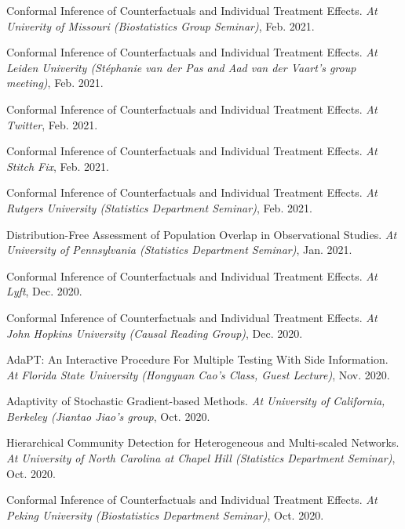 \documentclass{article}
\begin{document}
\vspace{2mm}
Conformal Inference of Counterfactuals and Individual Treatment Effects. \emph{At Univerity of Missouri (Biostatistics Group Seminar)}, Feb. 2021.

\vspace{2mm}
Conformal Inference of Counterfactuals and Individual Treatment Effects. \emph{At Leiden Univerity (Stéphanie van der Pas and Aad van der Vaart's group meeting)}, Feb. 2021.

\vspace{2mm}
Conformal Inference of Counterfactuals and Individual Treatment Effects. \emph{At Twitter}, Feb. 2021.

\vspace{2mm}
Conformal Inference of Counterfactuals and Individual Treatment Effects. \emph{At Stitch Fix}, Feb. 2021.

\vspace{2mm}
Conformal Inference of Counterfactuals and Individual Treatment Effects. \emph{At Rutgers University (Statistics Department Seminar)}, Feb. 2021.

\vspace{2mm}
Distribution-Free Assessment of Population Overlap in Observational Studies. \emph{At University of Pennsylvania (Statistics Department Seminar)}, Jan. 2021.

\vspace{2mm}
Conformal Inference of Counterfactuals and Individual Treatment Effects. \emph{At Lyft}, Dec. 2020.

\vspace{2mm}
Conformal Inference of Counterfactuals and Individual Treatment Effects. \emph{At John Hopkins University (Causal Reading Group)}, Dec. 2020.

\vspace{2mm}
AdaPT: An Interactive Procedure For Multiple Testing With Side Information. \emph{At Florida State University (Hongyuan Cao's Class, Guest Lecture)}, Nov. 2020. 

\vspace{2mm}
Adaptivity of Stochastic Gradient-based Methods. \emph{At University of California, Berkeley (Jiantao Jiao's group}, Oct. 2020. 

\vspace{2mm}
Hierarchical Community Detection for Heterogeneous and Multi-scaled Networks. \emph{At University of North Carolina at Chapel Hill (Statistics Department Seminar)}, Oct. 2020. 

\vspace{2mm}
Conformal Inference of Counterfactuals and Individual Treatment Effects. \emph{At Peking University (Biostatistics Department Seminar)}, Oct. 2020.
\end{document}
